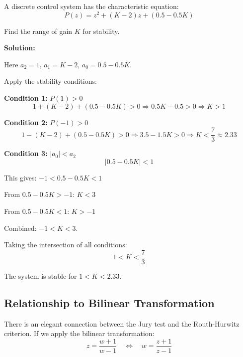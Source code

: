 \begin{example}
\label{ex:jury_margin}

A discrete control system has the characteristic equation:
\begin{equation}
P(z) = z^2 + (K-2)z + (0.5 - 0.5K)
\end{equation}

Find the range of gain $K$ for stability.

\textbf{Solution:}

Here $a_2 = 1$, $a_1 = K-2$, $a_0 = 0.5 - 0.5K$.

Apply the stability conditions:

\textbf{Condition 1:} $P(1) > 0$
\begin{equation}
1 + (K-2) + (0.5 - 0.5K) > 0 \Rightarrow 0.5K - 0.5 > 0 \Rightarrow K > 1
\end{equation}

\textbf{Condition 2:} $P(-1) > 0$
\begin{equation}
1 - (K-2) + (0.5 - 0.5K) > 0 \Rightarrow 3.5 - 1.5K > 0 \Rightarrow K < \frac{7}{3} \approx 2.33
\end{equation}

\textbf{Condition 3:} $|a_0| < a_2$
\begin{equation}
|0.5 - 0.5K| < 1
\end{equation}

This gives: $-1 < 0.5 - 0.5K < 1$

From $0.5 - 0.5K > -1$: $K < 3$

From $0.5 - 0.5K < 1$: $K > -1$

Combined: $-1 < K < 3$.

Taking the intersection of all conditions:
\begin{equation}
\boxed{1 < K < \frac{7}{3}}
\end{equation}

The system is stable for $1 < K < 2.33$.
\end{example}

\subsection{Relationship to Bilinear Transformation}

There is an elegant connection between the Jury test and the Routh-Hurwitz criterion. If we apply the bilinear transformation:
\begin{equation}
z = \frac{w+1}{w-1} \quad \Leftrightarrow \quad w = \frac{z+1}{z-1}
\end{equation}

